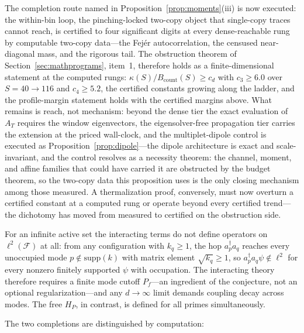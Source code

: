 \begin{remark}\label{rem:replica}
The completion route named in Proposition~\ref{prop:moments}(iii) is now
executed: the within-bin loop, the pinching-locked two-copy object that
single-copy traces cannot reach, is certified to four significant digits
at every dense-reachable rung by computable two-copy data---the Fej\'er
autocorrelation, the censused near-diagonal mass, and the rigorous
tail.  The obstruction theorem of Section~\ref{sec:mathprograms}, item~1,
therefore holds as a finite-dimensional statement at the computed rungs:
$\kappa(S)/B_{\mathrm{count}}(S)\ge c_{d}$ with $c_{3}\ge6.0$ over
$S=40\to116$ and $c_{4}\ge5.2$, the certified constants growing along the
ladder, and the profile-margin statement holds with the certified
margins above.  What remains is reach, not mechanism: beyond the dense
tier the exact evaluation of $A_T$ requires the window eigenvectors, the
eigensolver-free propagation tier carries the extension at the priced
wall-clock, and the multiplet-dipole control is executed as
Proposition~\ref{prop:dipole}---the dipole architecture is exact and
scale-invariant, and the control resolves as a necessity theorem: the
channel, moment, and affine families that could have carried it are
obstructed by the budget theorem, so the two-copy data this proposition uses
is the only closing mechanism among those measured. A
thermalization proof, conversely, must now overturn a certified constant
at a computed rung or operate beyond every certified trend---the
dichotomy has moved from measured to certified on the obstruction side.
\end{remark}

\begin{remark}\label{rem:modecount}
For an infinite active set the interacting terms do not define operators on
$\ell^{2}(\mathcal{F})$ at all: from any configuration with $k_{q}\geq1$, the hop
$a_{p}^{\dagger}a_{q}$ reaches every unoccupied mode $p\notin\mathrm{supp}(k)$ with matrix
element $\sqrt{k_{q}}\geq1$, so $a_{p}^{\dagger}a_{q}\psi\notin\ell^{2}$ for every nonzero
finitely supported $\psi$ with occupation. The interacting theory therefore requires a
finite mode cutoff $P_{f}$---an ingredient of the conjecture, not an optional
regularization---and any $d\to\infty$ limit demands coupling decay across modes. The free
$H_{P}$, in contrast, is defined for all primes simultaneously.
\end{remark}

The two completions are distinguished by computation:

